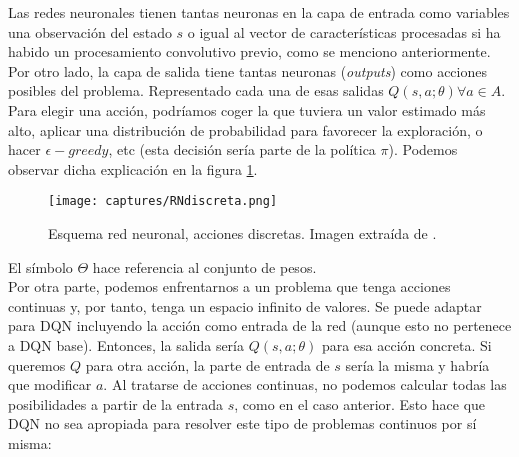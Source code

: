 \documentclass[11pt,fleqn]{book} %
\begin{document}

Las redes neuronales tienen tantas neuronas en la capa de entrada como variables una observación del estado $s$ o igual al vector de características procesadas si ha habido un procesamiento convolutivo previo, como se menciono anteriormente. Por otro lado, la capa de salida tiene tantas neuronas (\textit{outputs}) como acciones posibles del problema. Representado cada una de esas salidas $Q(s,a;\theta) \forall a \in A$. \\

Para elegir una acción, podríamos coger la que tuviera un valor estimado más alto, aplicar una distribución de probabilidad para favorecer la exploración, o hacer $\epsilon-greedy$, etc (esta decisión sería parte de la política $\pi$). Podemos observar dicha explicación en la figura \ref{fig:RNdiscreta}.

\begin{figure}[H]
	\centering\texttt{[image: captures/RNdiscreta.png]}
	\caption{Esquema red neuronal, acciones discretas. Imagen extraída de \cite{article:RLromero}.}
	\label{fig:RNdiscreta} %
\end{figure}

El símbolo $\Theta$ hace referencia al conjunto de pesos. \\

Por otra parte, podemos enfrentarnos a un problema que tenga acciones continuas y, por tanto, tenga un espacio infinito de valores. Se puede adaptar para DQN incluyendo la acción como entrada de la red (aunque esto no pertenece a DQN base). Entonces, la salida sería $Q(s,a;\theta)$ para esa acción concreta. Si queremos $Q$ para otra acción, la parte de entrada de $s$ sería la misma y habría que modificar $a$. Al tratarse de acciones continuas, no podemos calcular todas las posibilidades a partir de la entrada $s$, como en el caso anterior. Esto hace que DQN no sea apropiada para resolver este tipo de problemas continuos por sí misma:
\end{document}
